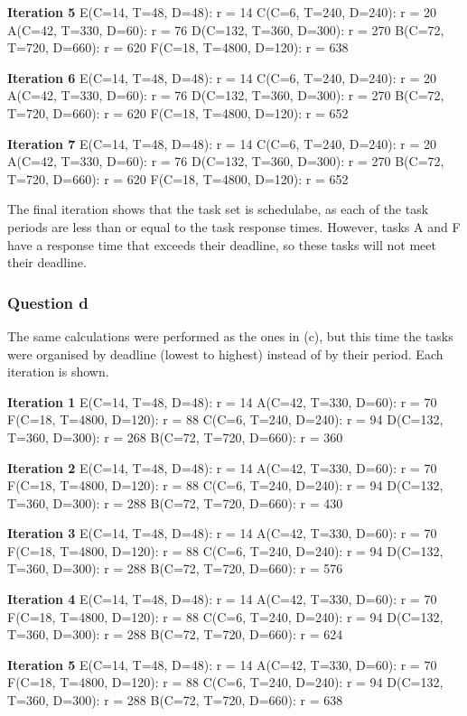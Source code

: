 \documentclass[]{report}
\begin{document}
		\textbf{Iteration 5}
		E(C=14, T=48, D=48): r = 14
		C(C=6, T=240, D=240): r = 20
		A(C=42, T=330, D=60): r = 76
		D(C=132, T=360, D=300): r = 270
		B(C=72, T=720, D=660): r = 620
		F(C=18, T=4800, D=120): r = 638

		\textbf{Iteration 6}
		E(C=14, T=48, D=48): r = 14
		C(C=6, T=240, D=240): r = 20
		A(C=42, T=330, D=60): r = 76
		D(C=132, T=360, D=300): r = 270
		B(C=72, T=720, D=660): r = 620
		F(C=18, T=4800, D=120): r = 652

		\textbf{Iteration 7}
		E(C=14, T=48, D=48): r = 14
		C(C=6, T=240, D=240): r = 20
		A(C=42, T=330, D=60): r = 76
		D(C=132, T=360, D=300): r = 270
		B(C=72, T=720, D=660): r = 620
		F(C=18, T=4800, D=120): r = 652
			
			The final iteration shows that the task set is schedulabe, as each of the task periods are less than or equal to the task response times. However, tasks A and F have a response time that exceeds their deadline, so these tasks will not meet their deadline.
			
			
			
			\subsubsection{Question d}
			The same calculations were performed as the ones in (c), but this time the tasks were organised by deadline (lowest to highest) instead of by their period. Each iteration is shown.

			\textbf{Iteration 1}
			E(C=14, T=48, D=48): r = 14
			A(C=42, T=330, D=60): r = 70
			F(C=18, T=4800, D=120): r = 88
			C(C=6, T=240, D=240): r = 94
			D(C=132, T=360, D=300): r = 268
			B(C=72, T=720, D=660): r = 360

			\textbf{Iteration 2}
			E(C=14, T=48, D=48): r = 14
			A(C=42, T=330, D=60): r = 70
			F(C=18, T=4800, D=120): r = 88
			C(C=6, T=240, D=240): r = 94
			D(C=132, T=360, D=300): r = 288
			B(C=72, T=720, D=660): r = 430

			\textbf{Iteration 3}
			E(C=14, T=48, D=48): r = 14
			A(C=42, T=330, D=60): r = 70
			F(C=18, T=4800, D=120): r = 88
			C(C=6, T=240, D=240): r = 94
			D(C=132, T=360, D=300): r = 288
			B(C=72, T=720, D=660): r = 576


			\textbf{Iteration 4}
			E(C=14, T=48, D=48): r = 14
			A(C=42, T=330, D=60): r = 70
			F(C=18, T=4800, D=120): r = 88
			C(C=6, T=240, D=240): r = 94
			D(C=132, T=360, D=300): r = 288
			B(C=72, T=720, D=660): r = 624

			\textbf{Iteration 5}
			E(C=14, T=48, D=48): r = 14
			A(C=42, T=330, D=60): r = 70
			F(C=18, T=4800, D=120): r = 88
			C(C=6, T=240, D=240): r = 94
			D(C=132, T=360, D=300): r = 288
			B(C=72, T=720, D=660): r = 638
\end{document}
